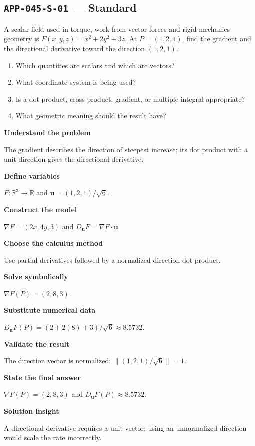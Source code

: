 \documentclass[11pt]{book}
\newcommand{\pid}[1]{\texttt{#1}}
\begin{document}
\subsection*{\pid{APP-045-S-01} — Standard}
\begin{problembox}
A scalar field used in torque, work from vector forces and rigid-mechanics geometry is $F(x,y,z)=x^2+2y^2+3z$. At $P=(1,2,1)$, find the gradient and the directional derivative toward the direction $(1,2,1)$.
\end{problembox}
\begin{promptbox}\begin{enumerate}
\item Which quantities are scalars and which are vectors?
\item What coordinate system is being used?
\item Is a dot product, cross product, gradient, or multiple integral appropriate?
\item What geometric meaning should the result have?
\end{enumerate}\end{promptbox}
\begin{solutionbox}
\textbf{Understand the problem}\par The gradient describes the direction of steepest increase; its dot product with a unit direction gives the directional derivative.\par\medskip
\textbf{Define variables}\par $F:\mathbb R^3\to\mathbb R$ and $\mathbf u=(1,2,1)/\sqrt6$.\par\medskip
\textbf{Construct the model}\par $\nabla F=(2x,4y,3)$ and $D_{\mathbf u}F=\nabla F\cdot\mathbf u$.\par\medskip
\textbf{Choose the calculus method}\par Use partial derivatives followed by a normalized-direction dot product.\par\medskip
\textbf{Solve symbolically}\par $\nabla F(P)=(2,8,3)$.\par\medskip
\textbf{Substitute numerical data}\par $D_{\mathbf u}F(P)=(2+2(8)+3)/\sqrt6\approx 8.5732$.\par\medskip
\textbf{Validate the result}\par The direction vector is normalized: $\|(1,2,1)/\sqrt6\|=1$.\par\medskip
\textbf{State the final answer}\par $\nabla F(P)=(2,8,3)$ and $D_{\mathbf u}F(P)\approx 8.5732$.\par\medskip
\textbf{Solution insight}\par A directional derivative requires a unit vector; using an unnormalized direction would scale the rate incorrectly.\par\medskip
\end{solutionbox}
\end{document}

